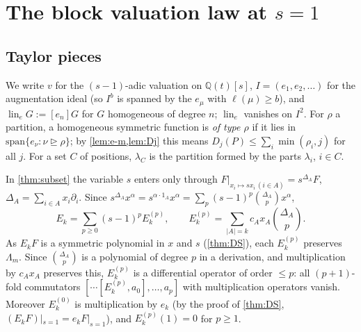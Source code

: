 \documentclass[11pt]{amsart}
\theoremstyle{definition}
\theoremstyle{remark}
\numberwithin{equation}{section}
\newcommand{\lin}{\operatorname{lin}_e}
\newcommand{\val}{v}
\newcommand{\Lam}{\Lambda}
\begin{document}
\section{The block valuation law at $s=1$}\label{sec:blocklaw}

\subsection{Taylor pieces}
We write $\val$ for the $(s-1)$-adic valuation on $\mathbb{Q}(t)[s]$, $I=(e_1,e_2,\dots)$ for the augmentation ideal (so $I^b$ is spanned by the $e_\mu$ with $\ell(\mu)\ge b$), and $\lin G:=[e_n]G$ for $G$ homogeneous of degree $n$; $\lin$ vanishes on $I^2$. For $\rho$ a partition, a homogeneous symmetric function is \emph{of type $\rho$} if it lies in $\mathrm{span}\{e_\nu:\nu\trianglerighteq\rho\}$; by \cref{lem:e-m,lem:Dj} this means $D_j(P)\le\sum_i\min(\rho_i,j)$ for all $j$. For a set $C$ of positions, $\lambda_C$ is the partition formed by the parts $\lambda_i$, $i\in C$.

In \cref{thm:subset} the variable $s$ enters only through $F|_{x_i\mapsto sx_i\,(i\in A)}=s^{\Delta_A}F$, $\Delta_A=\sum_{i\in A}x_i\partial_i$. Since $s^{\Delta_A}x^\alpha=s^{\alpha\cdot1_A}x^\alpha=\sum_p(s-1)^p\binom{\Delta_A}{p}x^\alpha$,
\begin{equation}\label{eq:taylor}
E_k=\sum_{p\ge0}(s-1)^pE_k^{(p)},\qquad E_k^{(p)}=\sum_{|A|=k}c_Ax_A\binom{\Delta_A}{p}.
\end{equation}
As $E_kF$ is a symmetric polynomial in $x$ and $s$ (\cref{thm:DS}), each $E_k^{(p)}$ preserves $\Lam_m$. Since $\binom{\Delta_A}p$ is a polynomial of degree $p$ in a derivation, and multiplication by $c_Ax_A$ preserves this, $E_k^{(p)}$ is a differential operator of order $\le p$: all $(p+1)$-fold commutators $[\cdots[E_k^{(p)},a_0],\dots,a_p]$ with multiplication operators vanish. Moreover $E_k^{(0)}$ is multiplication by $e_k$ (by the proof of \cref{thm:DS}, $(E_kF)|_{s=1}=e_kF|_{s=1}$), and $E_k^{(p)}(1)=0$ for $p\ge1$.
\end{document}
